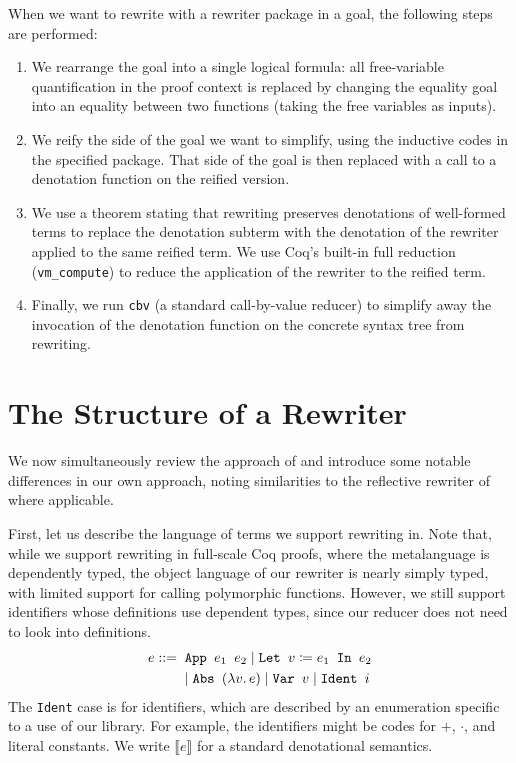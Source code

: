 When we want to rewrite with a rewriter package in a goal, the following steps are performed:
\begin{enumerate}
\item
  We rearrange the goal into a single logical formula: all free-variable quantification in the proof context is replaced by changing the equality goal into an equality between two functions (taking the free variables as inputs).
\item
  We reify the side of the goal we want to simplify, using the inductive codes in the specified package.  That side of the goal is then replaced with a call to a denotation function on the reified version.
\item
  We use a theorem stating that rewriting preserves denotations of well-formed terms to replace the denotation subterm with the denotation of the rewriter applied to the same reified term.
  We use Coq's built-in full reduction (\texttt{vm\_compute}) to reduce the application of the rewriter to the reified term.
\item
  Finally, we run \texttt{cbv} (a standard call-by-value reducer) to simplify away the invocation of the denotation function on the concrete syntax tree from rewriting.
\end{enumerate}


\section{The Structure of a Rewriter} \label{sec:structure}

We now simultaneously review the approach of \textcite{Aehlig} and introduce some notable differences in our own approach, noting similarities to the reflective rewriter of \textcite{rtac} where applicable.

First, let us describe the language of terms we support rewriting in.
Note that, while we support rewriting in full-scale Coq proofs, where the metalanguage is dependently typed, the object language of our rewriter is nearly simply typed, with limited support for calling polymorphic functions.
However, we still support identifiers whose definitions use dependent types, since our reducer does not need to look into definitions.
\begin{align*}
  e ::={}& \phantom{\mid} \texttt{App }e_1\texttt{ }e_2 \mid \texttt{Let }v \coloneqq e_1\texttt{ In }e_2 \\
  & \mid \texttt{Abs }(\lambda v.\,e) \mid \texttt{Var }v \mid \texttt{Ident }i
\end{align*}
The \texttt{Ident} case is for identifiers, which are described by an enumeration specific to a use of our library.
For example, the identifiers might be codes for $+$, $\cdot$, and literal constants.
We write $\llbracket e \rrbracket$ for a standard denotational semantics.

